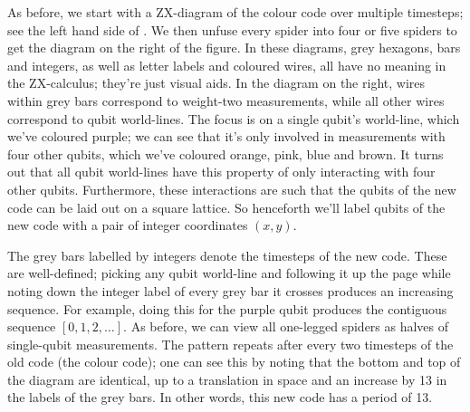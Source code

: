 As before, we start with a ZX-diagram of the colour code over multiple timesteps;
see the left hand side of .
We then unfuse every spider into four or five spiders to get the diagram on the right of the figure.
In these diagrams, grey hexagons, bars and integers, as well as letter labels and coloured wires, all have no meaning in the ZX-calculus; they're just visual aids.
In the diagram on the right, wires within grey bars correspond to weight-two measurements,
while all other wires correspond to qubit world-lines.
The focus is on a single qubit's world-line, which we've coloured purple;
we can see that it's only involved in measurements with four other qubits,
which we've coloured orange, pink, blue and brown.
It turns out that all qubit world-lines have this property of only interacting with four other qubits.
Furthermore, these interactions are such that the qubits of the new code can be laid out on a square lattice.
So henceforth we'll label qubits of the new code with a pair of integer coordinates $(x, y)$.

The grey bars labelled by integers denote the timesteps of the new code.
These are well-defined;
picking any qubit world-line and following it up the page
while noting down the integer label of every grey bar it crosses produces an increasing sequence.
For example, doing this for the purple qubit produces the contiguous sequence $[0, 1, 2, \ldots]$.
As before, we can view all one-legged spiders as halves of single-qubit measurements.
The pattern repeats after every two timesteps of the old code (the colour code);
one can see this by noting that the bottom and top of the diagram are identical,
up to a translation in space and an increase by 13 in the labels of the grey bars.
In other words, this new code has a period of 13.

